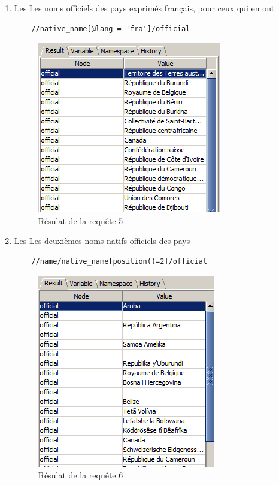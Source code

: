 \documentclass{article}
\begin{document}
\begin{enumerate}[1)]
\item Les Les noms officiels des pays exprimés français, pour ceux qui en ont \\
    \begin{lstlisting}
    //native_name[@lang = 'fra']/official
    \end{lstlisting}

    \begin{figure}[h!]
    \centering
    \includegraphics[scale=1]{query5.PNG}
    \caption{Résulat de la requête 5}
    \end{figure}

\item Les Les deuxièmes noms natifs officiels des pays\\
    \begin{lstlisting}
    //name/native_name[position()=2]/official
    \end{lstlisting}
    
   
    \begin{figure}[h!]
    \centering
    \includegraphics[scale=1]{query6.PNG}
    \caption{Résulat de la requête 6}
    \end{figure}


\end{enumerate}
\end{document}
